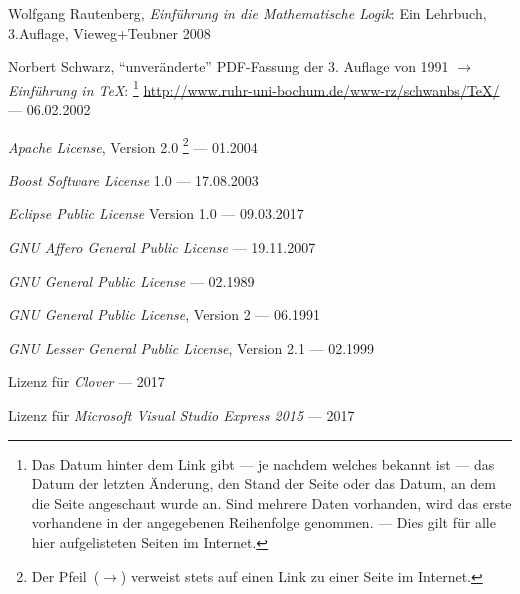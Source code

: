 \begin{flushleft}
	\begin{thebibliography}{12}
		\label{dic-Literaturverzeichnis}
		\likesection{\bibname}

		 Wolfgang Rautenberg,
		\emph{Einführung in die Mathematische Logik}:
		Ein Lehrbuch, 3.\@ Auflage, Vieweg+Teubner 2008

		 Norbert Schwarz,
		"`unveränderte"' PDF-Fassung der 3. Auflage von 1991
		$\rightarrow$%
		\emph{Einführung in \TeX}:
		\footnote{%
			Das Datum hinter dem Link gibt --- je nachdem welches bekannt ist --- das Datum der letzten Änderung, den Stand der Seite oder das Datum, an dem die Seite angeschaut wurde an.
			Sind mehrere Daten vorhanden, wird das erste vorhandene in der angegebenen Reihenfolge genommen.
			--- Dies gilt für alle hier aufgelisteten Seiten im Internet.
		}
		\url{http://www.ruhr-uni-bochum.de/www-rz/schwanbs/TeX/}
		--- 06.02.2002

		 \emph{Apache License}, Version 2.0
		\footnote{%
			Der Pfeil~($\rightarrow$) verweist stets auf einen Link zu einer Seite im Internet.
		}
		--- 01.2004%

		 \emph{Boost Software License} 1.0
		--- 17.08.2003

		 \emph{Eclipse Public License} Version 1.0
		--- 09.03.2017

		 \emph{GNU Affero General Public License}
		--- 19.11.2007

		 \emph{GNU General Public License}
		--- 02.1989

		 \emph{GNU General Public License}, Version 2
		--- 06.1991

		 \emph{GNU Lesser General Public License},
		Version 2.1
		--- 02.1999

		 Lizenz für \emph{Clover}
		--- 2017

		 Lizenz
		für \emph{Microsoft Visual Studio Express 2015}
		--- 2017


\end{thebibliography}
\end{flushleft}
